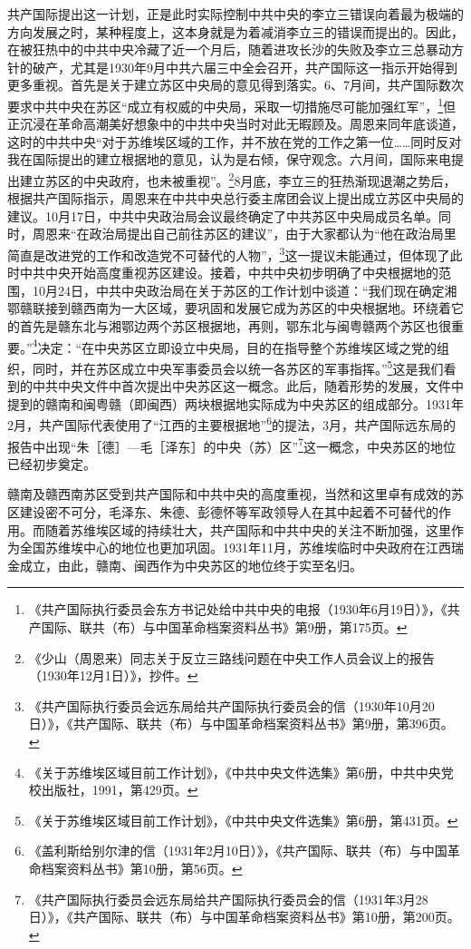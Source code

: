 共产国际提出这一计划，正是此时实际控制中共中央的李立三错误向着最为极端的方向发展之时，某种程度上，这本身就是为着减消李立三的错误而提出的。因此，在被狂热中的中共中央冷藏了近一个月后，随着进攻长沙的失败及李立三总暴动方针的破产，尤其是1930年9月中共六届三中全会召开，共产国际这一指示开始得到更多重视。首先是关于建立苏区中央局的意见得到落实。6、7月间，共产国际数次要求中共中央在苏区“成立有权威的中央局，采取一切措施尽可能加强红军”，\footnote{《共产国际执行委员会东方书记处给中共中央的电报（1930年6月19日）》，《共产国际、联共（布）与中国革命档案资料丛书》第9册，第175页。}但正沉浸在革命高潮美好想象中的中共中央当时对此无暇顾及。周恩来同年底谈道，这时的中共中央“对于苏维埃区域的工作，并不放在党的工作之第一位……同时反对我在国际提出的建立根据地的意见，认为是右倾，保守观念。六月间，国际来电提出建立苏区的中央政府，也未被重视”。\footnote{《少山（周恩来）同志关于反立三路线问题在中央工作人员会议上的报告（1930年12月1日）》，抄件。}8月底，李立三的狂热渐现退潮之势后，根据共产国际指示，周恩来在中共中央总行委主席团会议上提出成立苏区中央局的建议。10月17日，中共中央政治局会议最终确定了中共苏区中央局成员名单。同时，周恩来“在政治局提出自己前往苏区的建议”，由于大家都认为“他在政治局里简直是改进党的工作和改造党不可替代的人物”，\footnote{《共产国际执行委员会远东局给共产国际执行委员会的信（1930年10月20日）》，《共产国际、联共（布）与中国革命档案资料丛书》第9册，第396页。}这一提议未能通过，但体现了此时中共中央开始高度重视苏区建设。接着，中共中央初步明确了中央根据地的范围，10月24日，中共中央政治局在关于苏区的工作计划中谈道：“我们现在确定湘鄂赣联接到赣西南为一大区域，要巩固和发展它成为苏区的中央根据地。环绕着它的首先是赣东北与湘鄂边两个苏区根据地，再则，鄂东北与闽粤赣两个苏区也很重要。”\footnote{《关于苏维埃区域目前工作计划》，《中共中央文件选集》第6册，中共中央党校出版社，1991，第429页。}决定：“在中央苏区立即设立中央局，目的在指导整个苏维埃区域之党的组织，同时，并在苏区成立中央军事委员会以统一各苏区的军事指挥。”\footnote{《关于苏维埃区域目前工作计划》，《中共中央文件选集》第6册，第431页。}这是我们看到的中共中央文件中首次提出中央苏区这一概念。此后，随着形势的发展，文件中提到的赣南和闽粤赣（即闽西）两块根据地实际成为中央苏区的组成部分。1931年2月，共产国际代表使用了“江西的主要根据地”\footnote{《盖利斯给别尔津的信（1931年2月10日）》，《共产国际、联共（布）与中国革命档案资料丛书》第10册，第56页。}的提法，3月，共产国际远东局的报告中出现“朱［德］—毛［泽东］的中央（苏）区”\footnote{《共产国际执行委员会远东局给共产国际执行委员会的信（1931年3月28日）》，《共产国际、联共（布）与中国革命档案资料丛书》第10册，第200页。}这一概念，中央苏区的地位已经初步奠定。


赣南及赣西南苏区受到共产国际和中共中央的高度重视，当然和这里卓有成效的苏区建设密不可分，毛泽东、朱德、彭德怀等军政领导人在其中起着不可替代的作用。而随着苏维埃区域的持续壮大，共产国际和中共中央的关注不断加强，这里作为全国苏维埃中心的地位也更加巩固。1931年11月，苏维埃临时中央政府在江西瑞金成立，由此，赣南、闽西作为中央苏区的地位终于实至名归。


